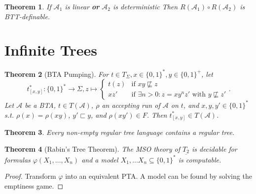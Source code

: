 \documentclass{article}
\newtheorem{theorem}{Theorem}[section]
\begin{document}
\begin{theorem}
	If $\mathcal{A}_1$ is linear \textbf{or} $\mathcal{A}_2$ is deterministic Then $R(\mathcal{A}_1) \circ R(\mathcal{A}_2)$ is BTT-definable.
\end{theorem}


\section{Infinite Trees}
\begin{theorem}[BTA Pumping]
	For $t \in T_\Sigma, x \in \{0,1\}^*, y \in \{0,1\}^+$, let 
	$$t^*_{[x,y]} : \{0,1\}^* \rightarrow \Sigma, z \mapsto \begin{cases} t(z) & \text{if } xy \not\sqsubseteq z \\ xz' & \text{if } \exists n>0: z = xy^nz' \text{ with } y \not\sqsubseteq z' \end{cases}.$$
	Let $\mathcal{A}$ be a BTA, $t \in T(\mathcal{A})$, $\rho$ an accepting run of $\mathcal{A}$ on $t$, and $x, y, y' \in \{0,1\}^*$ s.t. $\rho(x) = \rho(xy)$, $y' \sqsubset y$, and $\rho(xy') \in F$. Then $t^*_{[x,y]} \in T(\mathcal{A})$.
\end{theorem}

\begin{theorem}
	Every non-empty regular tree language contains a regular tree.
\end{theorem}

\begin{theorem}[Rabin's Tree Theorem]
	The MSO theory of $\underline{T_2}$ is decidable for formulas $\varphi(X_1, \dots, X_n)$ and a model $X_1, \dots X_n \subseteq \{0,1\}^*$ is computable.
\end{theorem}
\begin{proof}
	Transform $\varphi$ into an equivalent PTA. A model can be found by solving the emptiness game.
\end{proof}
\end{document}
